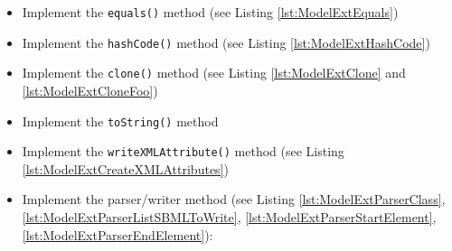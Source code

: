 \begin{itemize}
        \item Implement the \texttt{equals()} method (see Listing \ref{lst:ModelExtEquals})
        \item Implement the \texttt{hashCode()} method (see Listing \ref{lst:ModelExtHashCode})
        \item Implement the \texttt{clone()} method (see Listing \ref{lst:ModelExtClone} and \ref{lst:ModelExtCloneFoo})
        \item Implement the \texttt{toString()} method
        \item Implement the \texttt{writeXMLAttribute()} method (see Listing \ref{lst:ModelExtCreateXMLAttributes})
        \item Implement the parser/writer method (see Listing \ref{lst:ModelExtParserClass}, \ref{lst:ModelExtParserListSBMLToWrite}, \ref{lst:ModelExtParserStartElement}, \ref{lst:ModelExtParserEndElement}):
   \end{itemize}
